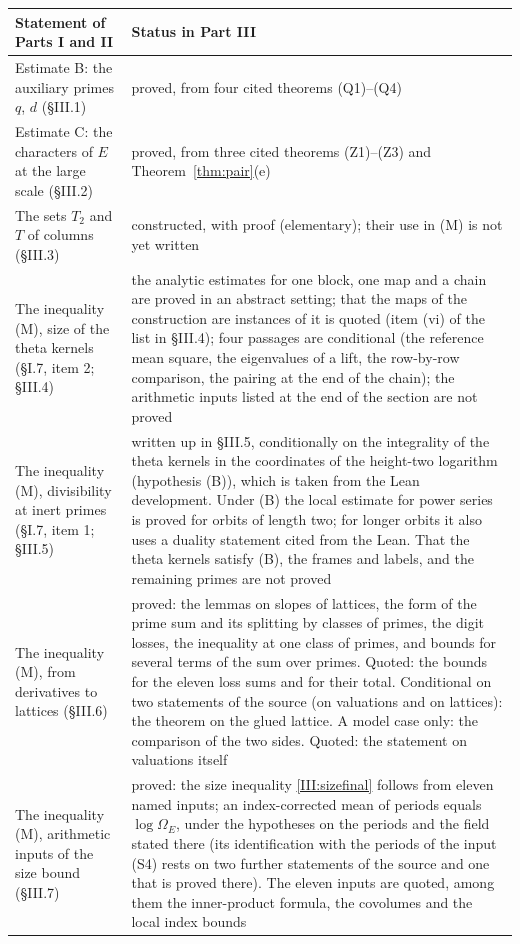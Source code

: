 \documentclass[11pt,letterpaper]{article}
\begin{document}
{\small\setlength{\LTleft}{\fill}\setlength{\LTright}{\fill}
\begin{longtable}{p{}p{}}
\toprule
Statement of Parts I and II & Status in Part III\\
\midrule\endhead
\bottomrule\endfoot
Estimate B: the auxiliary primes $q$, $d$ (\S III.1) & proved, from four cited theorems (Q1)--(Q4)\\
Estimate C: the characters of $E$ at the large scale (\S III.2) & proved, from three cited theorems (Z1)--(Z3) and Theorem~\ref{thm:pair}(e)\\
The sets $T_2$ and $T$ of columns (\S III.3) & constructed, with proof (elementary); their use in (M) is not yet written\\
The inequality (M), size of the theta kernels (\S I.7, item 2; \S III.4) & the analytic estimates for one block, one map and a chain are proved in an abstract setting; that the maps of the construction are instances of it is quoted (item (vi) of the list in \S III.4); four passages are conditional (the reference mean square, the eigenvalues of a lift, the row-by-row comparison, the pairing at the end of the chain); the arithmetic inputs listed at the end of the section are not proved\\
The inequality (M), divisibility at inert primes (\S I.7, item 1; \S III.5) & written up in \S III.5, conditionally on the integrality of the theta kernels in the coordinates of the height-two logarithm (hypothesis (B)), which is taken from the Lean development. Under (B) the local estimate for power series is proved for orbits of length two; for longer orbits it also uses a duality statement cited from the Lean. That the theta kernels satisfy (B), the frames and labels, and the remaining primes are not proved\\
The inequality (M), from derivatives to lattices (\S III.6) & proved: the lemmas on slopes of lattices, the form of the prime sum and its splitting by classes of primes, the digit losses, the inequality at one class of primes, and bounds for several terms of the sum over primes. Quoted: the bounds for the eleven loss sums and for their total. Conditional on two statements of the source (on valuations and on lattices): the theorem on the glued lattice. A model case only: the comparison of the two sides. Quoted: the statement on valuations itself\\
The inequality (M), arithmetic inputs of the size bound (\S III.7) & proved: the size inequality \eqref{III:sizefinal} follows from eleven named inputs; an index-corrected mean of periods equals $\log\Omega_E$, under the hypotheses on the periods and the field stated there (its identification with the periods of the input (S4) rests on two further statements of the source and one that is proved there). The eleven inputs are quoted, among them the inner-product formula, the covolumes and the local index bounds\\

\end{longtable}}
\end{document}
